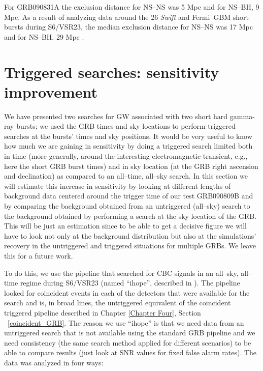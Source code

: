 For GRB090831A the exclusion distance for NS--NS was 5 Mpc and for NS--BH, 9 Mpc. As a result of analyzing data around the 26 \emph{Swift} and Fermi--GBM short bursts during S6/VSR23, the median exclusion distance for NS--NS was 17 Mpc and for NS--BH, 29 Mpc \cite{lvc:s6grb}.

\section{Triggered searches: sensitivity improvement}
\label{sens_imprv}

We have presented two searches for GW associated with two short hard gamma-ray bursts; we used the GRB times and sky locations to perform triggered searches at the bursts' times and sky positions. It would be very useful to know how much we are gaining in sensitivity by doing a triggered search limited both in time (more generally, around the interesting electromagnetic transient, e.g., here the short GRB burst times) and in sky location (at the GRB right ascension and declination) as compared to an all--time, all--sky search. In this section we will estimate this increase in sensitivity by looking at different lengths of background data centered around the trigger time of our test GRB090809B and by comparing the background obtained from an untriggered (all--sky) search to the background obtained by performing a search at the sky location of the GRB. This will be just an estimation since to be able to get a decisive figure we will have to look not only at the background distribution but also at the simulations' recovery in the untriggered and triggered situations for multiple GRBs. We leave this for a future work.

To do this, we use the pipeline that searched for \ac{CBC} signals in an all--sky, all--time regime during S6/VSR23 (named ``ihope'', described in \cite{Abadie:2010yb, Colaboration:2011nz}). The pipeline looked for coincident events in each of the detectors that were available for the search and is, in broad lines, the untriggered equivalent of the coincident triggered pipeline described in Chapter \ref{Chapter Four}, Section ~\ref{coincident_GRB}. The reason we use ``ihope'' is that we need data from an untriggered search that is not available using the standard GRB pipeline and we need consistency (the same search method applied for different scenarios) to be able to compare results (just look at SNR values for fixed false alarm rates). The data was analyzed in four ways:

